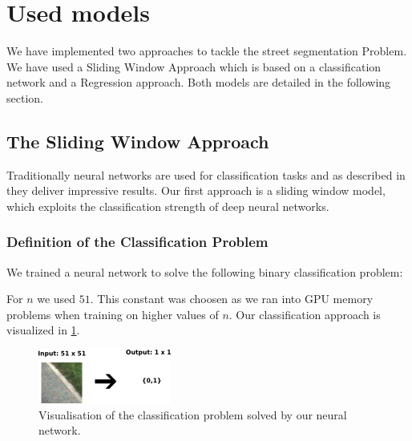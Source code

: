 
\section{Used models}\label{sec:model}

We have implemented two approaches to tackle  the street segmentation Problem. We have used a Sliding Window Approach which is based on a classification network and a Regression approach. Both models are detailed in the following section.

\subsection{The Sliding Window Approach}

Traditionally neural networks are used for classification tasks and as described in  they deliver impressive results. Our first approach is a sliding window model, which exploits the classification strength of deep neural networks.

\subsubsection{Definition of the Classification Problem}

We trained a neural network to solve the following binary classification problem:


For $n$ we used $51$. This constant was choosen as we ran into GPU memory problems when training on higher values of $n$. Our classification approach is visualized in \cref{fig:figure}.

\begin{figure}[H]
	\centering
	\includegraphics[width=0.5\columnwidth]{figures/models/sliding_window.png}
	\caption{Visualisation of the classification problem solved by our neural network.}
	\label{fig:figure}
\end{figure}


